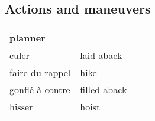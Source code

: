 \documentclass[a4paper, 12pt, twoside]{article}
\begin{document}
\begin{indt}{\section{Actions and maneuvers}}
\begin{tabular}{|l|l|l|}
            \hline %
            planner %
            &
            &
            \\
            \hline %
            culer %
            & laid aback
            &
            \\
            \hline %
            faire du rappel %
            & hike
            &
            \\
            \hline %
            gonflé à contre %
            & filled aback
            &
            \\
            \hline %
            hisser %
            & hoist
            &
            \\
            \hline %
        \end{tabular}
    \end{indt} %
\end{document}
